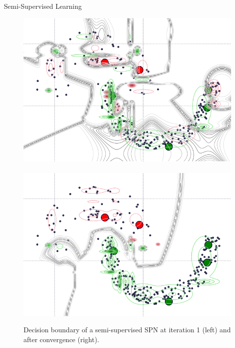 \begin{frame}{Semi-Supervised Learning}{}
\begin{figure}
    \includegraphics[width=.47\textwidth]{semisupervised_2_2}~
    \includegraphics[width=.47\textwidth]{semisupervised_20_2}
    \caption{Decision boundary of a semi-supervised SPN at iteration 1 (left) and after convergence (right).}
\end{figure}

\end{frame}

